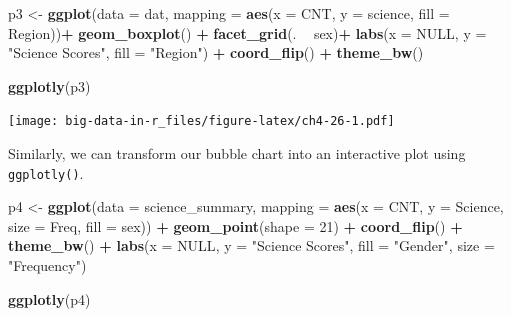 \documentclass[]{book}
\newenvironment{Shaded}{\begin{snugshade}}{\end{snugshade}}
\newcommand{\DataTypeTok}[1]{\textcolor[rgb]{0.13,0.29,0.53}{#1}}
\newcommand{\DecValTok}[1]{\textcolor[rgb]{0.00,0.00,0.81}{#1}}
\newcommand{\KeywordTok}[1]{\textcolor[rgb]{0.13,0.29,0.53}{\textbf{#1}}}
\newcommand{\NormalTok}[1]{#1}
\newcommand{\OperatorTok}[1]{\textcolor[rgb]{0.81,0.36,0.00}{\textbf{#1}}}
\newcommand{\OtherTok}[1]{\textcolor[rgb]{0.56,0.35,0.01}{#1}}
\newcommand{\StringTok}[1]{\textcolor[rgb]{0.31,0.60,0.02}{#1}}
\begin{document}
\begin{Shaded}
\begin{Highlighting}[]
\NormalTok{p3 <-}\StringTok{ }\KeywordTok{ggplot}\NormalTok{(}\DataTypeTok{data =}\NormalTok{ dat,}
             \DataTypeTok{mapping =} \KeywordTok{aes}\NormalTok{(}\DataTypeTok{x =}\NormalTok{ CNT, }\DataTypeTok{y =}\NormalTok{ science, }\DataTypeTok{fill =}\NormalTok{ Region))}\OperatorTok{+}
\StringTok{  }\KeywordTok{geom_boxplot}\NormalTok{() }\OperatorTok{+}
\StringTok{  }\KeywordTok{facet_grid}\NormalTok{(. }\OperatorTok{~}\StringTok{ }\NormalTok{sex)}\OperatorTok{+}
\StringTok{  }\KeywordTok{labs}\NormalTok{(}\DataTypeTok{x =} \OtherTok{NULL}\NormalTok{, }\DataTypeTok{y =} \StringTok{"Science Scores"}\NormalTok{, }\DataTypeTok{fill =} \StringTok{"Region"}\NormalTok{) }\OperatorTok{+}
\StringTok{  }\KeywordTok{coord_flip}\NormalTok{() }\OperatorTok{+}
\StringTok{  }\KeywordTok{theme_bw}\NormalTok{()}

\KeywordTok{ggplotly}\NormalTok{(p3)}
\end{Highlighting}
\end{Shaded}

\texttt{[image: big-data-in-r\_files/figure-latex/ch4-26-1.pdf]}

Similarly, we can transform our bubble chart into an interactive plot using \texttt{ggplotly()}.

\begin{Shaded}
\begin{Highlighting}[]
\NormalTok{p4 <-}\StringTok{ }\KeywordTok{ggplot}\NormalTok{(}\DataTypeTok{data =}\NormalTok{ science_summary,}
       \DataTypeTok{mapping =} \KeywordTok{aes}\NormalTok{(}\DataTypeTok{x =}\NormalTok{ CNT, }\DataTypeTok{y =}\NormalTok{ Science, }\DataTypeTok{size =}\NormalTok{ Freq, }\DataTypeTok{fill =}\NormalTok{ sex)) }\OperatorTok{+}
\StringTok{  }\KeywordTok{geom_point}\NormalTok{(}\DataTypeTok{shape =} \DecValTok{21}\NormalTok{) }\OperatorTok{+}
\StringTok{  }\KeywordTok{coord_flip}\NormalTok{() }\OperatorTok{+}
\StringTok{  }\KeywordTok{theme_bw}\NormalTok{() }\OperatorTok{+}
\StringTok{  }\KeywordTok{labs}\NormalTok{(}\DataTypeTok{x =} \OtherTok{NULL}\NormalTok{, }\DataTypeTok{y =} \StringTok{"Science Scores"}\NormalTok{, }\DataTypeTok{fill =} \StringTok{"Gender"}\NormalTok{,}
       \DataTypeTok{size =} \StringTok{"Frequency"}\NormalTok{)}

\KeywordTok{ggplotly}\NormalTok{(p4)}
\end{Highlighting}
\end{Shaded}
\end{document}
